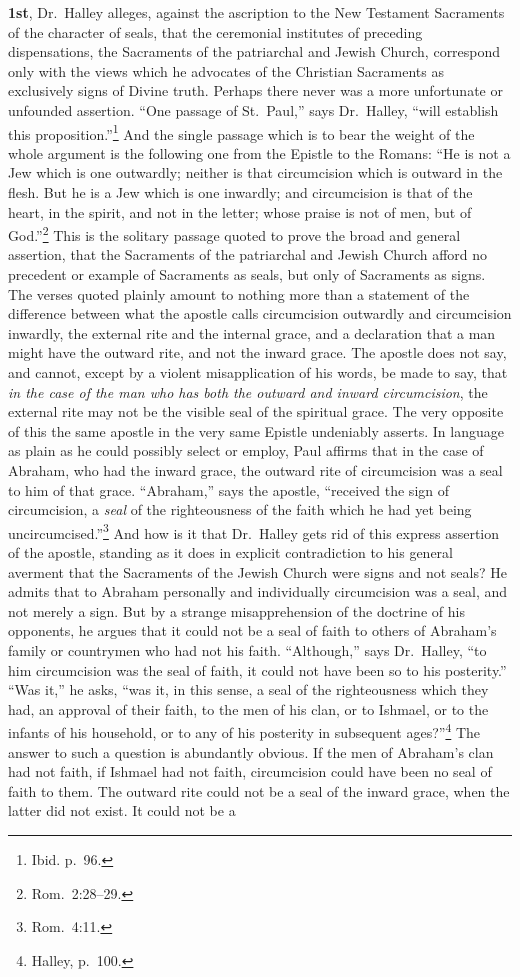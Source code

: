 \documentclass[
]{book}
\begin{document}
\textbf{1st}, Dr.~Halley alleges, against the ascription to the New Testament Sacraments of the character of seals, that the ceremonial institutes of preceding dispensations, the Sacraments of the patriarchal and Jewish Church, correspond only with the views which he advocates of the Christian Sacraments as exclusively signs of Divine truth. Perhaps there never was a more unfortunate or unfounded assertion. ``One passage of St.~Paul,'' says Dr.~Halley, ``will establish this proposition.''\footnote{Ibid. p.~96.} And the single passage which is to bear the weight of the whole argument is the following one from the Epistle to the Romans: ``He is not a Jew which is one outwardly; neither is that circumcision which is outward in the flesh. But he is a Jew which is one inwardly; and circumcision is that of the heart, in the spirit, and not in the letter; whose praise is not of men, but of God.''\footnote{Rom.~2:28--29.} This is the solitary passage quoted to prove the broad and general assertion, that the Sacraments of the patriarchal and Jewish Church afford no precedent or example of Sacraments as seals, but only of Sacraments as signs. The verses quoted plainly amount to nothing more than a statement of the difference between what the apostle calls circumcision outwardly and circumcision inwardly, the external rite and the internal grace, and a declaration that a man might have the outward rite, and not the inward grace. The apostle does not say, and cannot, except by a violent misapplication of his words, be made to say, that \emph{in the case of the man who has both the outward and inward circumcision}, the external rite may not be the visible seal of the spiritual grace. The very opposite of this the same apostle in the very same Epistle undeniably asserts. In language as plain as he could possibly select or employ, Paul affirms that in the case of Abraham, who had the inward grace, the outward rite of circumcision was a seal to him of that grace. ``Abraham,'' says the apostle, ``received the sign of circumcision, a \emph{seal} of the righteousness of the faith which he had yet being uncircumcised.''\footnote{Rom.~4:11.} And how is it that Dr.~Halley gets rid of this express assertion of the apostle, standing as it does in explicit contradiction to his general averment that the Sacraments of the Jewish Church were signs and not seals? He admits that to Abraham personally and individually circumcision was a seal, and not merely a sign. But by a strange misapprehension of the doctrine of his opponents, he argues that it could not be a seal of faith to others of Abraham's family or countrymen who had not his faith. ``Although,'' says Dr.~Halley, ``to him circumcision was the seal of faith, it could not have been so to his posterity.'' ``Was it,'' he asks, ``was it, in this sense, a seal of the righteousness which they had, an approval of their faith, to the men of his clan, or to Ishmael, or to the infants of his household, or to any of his posterity in subsequent ages?''\footnote{Halley, p.~100.} The answer to such a question is abundantly obvious. If the men of Abraham's clan had not faith, if Ishmael had not faith, circumcision could have been no seal of faith to them. The outward rite could not be a seal of the inward grace, when the latter did not exist. It could not be a 
\end{document}
